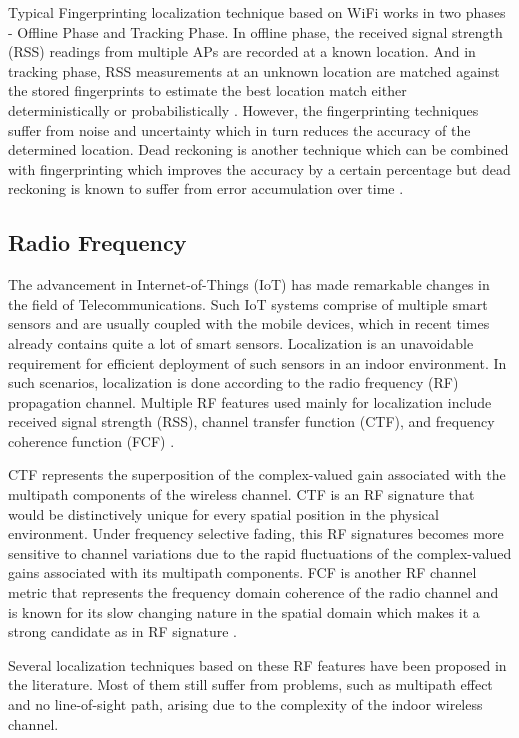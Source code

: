 Typical Fingerprinting localization technique based on WiFi works in two phases - Offline Phase and Tracking Phase. In offline phase, the received signal strength (RSS) readings from multiple APs are recorded at a known location. And in tracking phase, RSS measurements at an unknown location are matched against the stored fingerprints to estimate the best location match either deterministically or probabilistically \cite{wideep}. However, the fingerprinting techniques suffer from noise and uncertainty which in turn reduces the accuracy of the determined location. Dead reckoning is another technique which can be combined with fingerprinting which improves the accuracy by a certain percentage but dead reckoning is known to suffer from error accumulation over time \cite{cnn}.

\subsection{Radio Frequency}
The advancement in Internet-of-Things (IoT) has made remarkable changes in the field of Telecommunications. Such IoT systems comprise of multiple smart sensors and are usually coupled with the mobile devices, which in recent times already contains quite a lot of smart sensors. Localization is an unavoidable requirement for efficient deployment of such sensors in an indoor environment. In such scenarios, localization is done according to the radio frequency (RF) propagation channel. Multiple RF features used mainly for localization include received signal strength (RSS), channel transfer function (CTF), and frequency coherence function (FCF) \cite{cascade}.

CTF represents the superposition of the complex-valued gain associated with the multipath components of the wireless channel. CTF is an RF signature that would be distinctively unique for every spatial position in the physical environment. Under frequency selective fading, this RF signatures becomes more sensitive to channel variations due to the rapid fluctuations of the complex-valued gains associated with its multipath components. FCF is another RF channel metric that represents the frequency domain coherence of the radio channel and is known for its slow changing nature in the spatial domain which makes it a strong candidate as in RF signature \cite{real-dl}.

Several localization techniques based on these RF features have been proposed in the literature. Most of them still suffer from problems, such as multipath effect and no line-of-sight path, arising due to the complexity of the indoor wireless channel.


